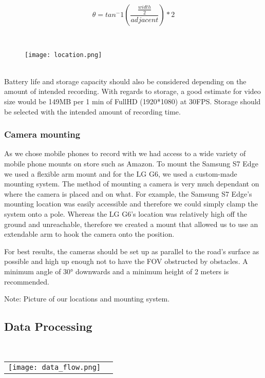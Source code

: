 \begin{equation}
    \theta = tan^-1(\frac{\frac{width}{2}}{adjacent}) * 2\label{eq:1}
  \end{equation}

\ \\ 
\begin{figure}[h]
\texttt{[image: location.png]}
\centering 
\end{figure}
\label{Camera location}

\ \\
Battery life and storage capacity should also be considered depending on the amount of intended recording. 
With regards to storage, a good estimate for video size would be 149MB per 1 min of FullHD (1920*1080) at 30FPS. Storage should be selected
with the intended amount of recording time.

\subsubsection{Camera mounting}

As we chose mobile phones to record with we had access to a wide variety of mobile phone mounts on store such as Amazon.
To mount the Samsung S7 Edge we used a flexible arm mount and for the LG G6, we used a custom-made mounting system.
The method of mounting a camera is very much dependant on where the camera is placed and on what. For example, the Samsung S7 Edge's
mounting location was easily accessible and therefore we could simply clamp the system onto a pole. Whereas the LG G6's location was relatively 
high off the ground and unreachable, therefore we created a mount that allowed us to use an extendable arm to hook the camera onto the position.

For best results, the cameras should be set up as parallel to the road's surface as possible and high up enough not to have the FOV obstructed by obstacles.
A minimum angle of 30° downwards and a minimum height of 2 meters is recommended.

Note: Picture of our locations and mounting system.

\subsection{Data Processing}

\ \\ 
\noindent
\begin{tabular}{@{}cc}
\texttt{[image: data\_flow.png]} 
\end{tabular}
\label{data}


